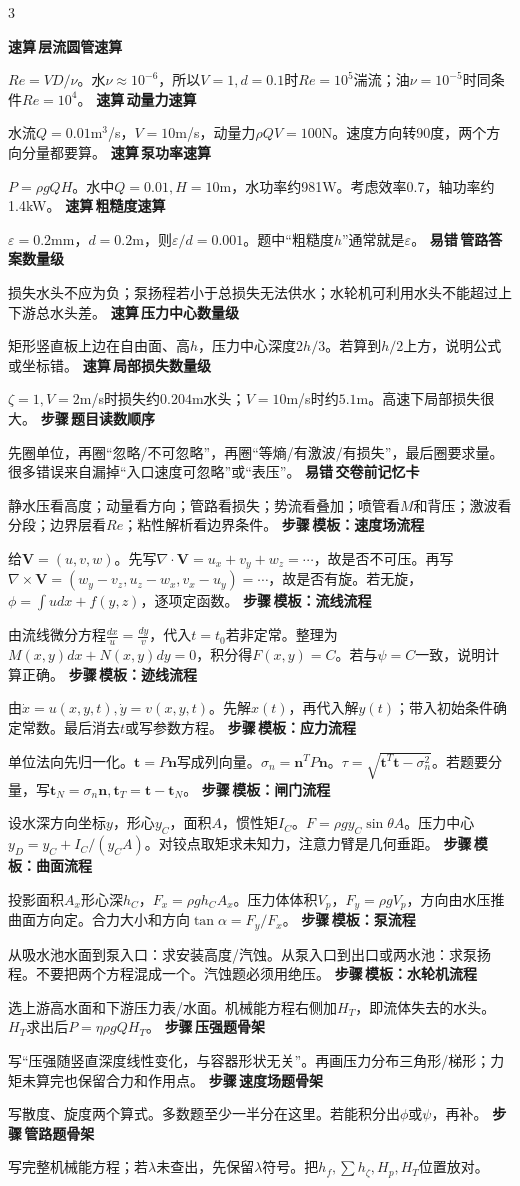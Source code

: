 \documentclass[a4paper]{article}
\newcommand{\labtag}[3]{{\bfseries\color{#1}\colorbox{#1}{\color{white}\fontsize{2.35}{2.48}\selectfont #2}\,#3}\par}
\newcommand{\step}[1]{\labtag{S}{步骤}{#1}}
\newcommand{\err}[1]{\labtag{R}{易错}{#1}}
\newcommand{\stepq}[1]{\step{#1}}
\newcommand{\errq}[1]{\err{#1}}
\newcommand{\quickq}[1]{\labtag{F}{速算}{#1}}
\newenvironment{vfourWrap}{\par\begingroup\fontsize{2.68}{2.84}\selectfont\setlength{\fboxsep}{0.45pt}}{\par\endgroup}
\begin{document}
\begin{multicols}{3}
\begin{vfourWrap}
\quickq{层流圆管速算}
$Re=VD/\nu$。水$\nu\approx10^{-6}$，所以$V=1,d=0.1$时$Re=10^5$湍流；油$\nu=10^{-5}$时同条件$Re=10^4$。
\quickq{动量力速算}
水流$Q=0.01$m$^3$/s，$V=10$m/s，动量力$\rho QV=100$N。速度方向转90度，两个方向分量都要算。
\quickq{泵功率速算}
$P=\rho gQH$。水中$Q=0.01,H=10$m，水功率约981W。考虑效率0.7，轴功率约1.4kW。
\quickq{粗糙度速算}
$\varepsilon=0.2$mm，$d=0.2$m，则$\varepsilon/d=0.001$。题中“粗糙度$h$”通常就是$\varepsilon$。
\errq{管路答案数量级}
损失水头不应为负；泵扬程若小于总损失无法供水；水轮机可利用水头不能超过上下游总水头差。
\quickq{压力中心数量级}
矩形竖直板上边在自由面、高$h$，压力中心深度$2h/3$。若算到$h/2$上方，说明公式或坐标错。
\quickq{局部损失数量级}
$\zeta=1,V=2$m/s时损失约$0.204$m水头；$V=10$m/s时约$5.1$m。高速下局部损失很大。
\stepq{题目读数顺序}
先圈单位，再圈“忽略/不可忽略”，再圈“等熵/有激波/有损失”，最后圈要求量。很多错误来自漏掉“入口速度可忽略”或“表压”。
\errq{交卷前记忆卡}
静水压看高度；动量看方向；管路看损失；势流看叠加；喷管看$M$和背压；激波看分段；边界层看$Re$；粘性解析看边界条件。
\stepq{模板：速度场流程}
给$\bm V=(u,v,w)$。先写$\nabla\cdot\bm V=u_x+v_y+w_z=\cdots$，故是否不可压。再写$\nabla\times\bm V=(w_y-v_z,u_z-w_x,v_x-u_y)=\cdots$，故是否有旋。若无旋，$\phi=\int u dx+f(y,z)$，逐项定函数。
\stepq{模板：流线流程}
由流线微分方程$\frac{dx}{u}=\frac{dy}{v}$，代入$t=t_0$若非定常。整理为$M(x,y)dx+N(x,y)dy=0$，积分得$F(x,y)=C$。若与$\psi=C$一致，说明计算正确。
\stepq{模板：迹线流程}
由$\dot x=u(x,y,t),\dot y=v(x,y,t)$。先解$x(t)$，再代入解$y(t)$；带入初始条件确定常数。最后消去$t$或写参数方程。
\stepq{模板：应力流程}
单位法向先归一化。$\bm t=P\bm n$写成列向量。$\sigma_n=\bm n^T P\bm n$。$\tau=\sqrt{\bm t^T\bm t-\sigma_n^2}$。若题要分量，写$\bm t_N=\sigma_n\bm n,\bm t_T=\bm t-\bm t_N$。
\stepq{模板：闸门流程}
设水深方向坐标$y$，形心$y_C$，面积$A$，惯性矩$I_C$。$F=\rho g y_C\sin\theta A$。压力中心$y_D=y_C+I_C/(y_CA)$。对铰点取矩求未知力，注意力臂是几何垂距。
\stepq{模板：曲面流程}
投影面积$A_x$形心深$h_C$，$F_x=\rho gh_CA_x$。压力体体积$V_p$，$F_y=\rho gV_p$，方向由水压推曲面方向定。合力大小和方向$\tan\alpha=F_y/F_x$。
\stepq{模板：泵流程}
从吸水池水面到泵入口：求安装高度/汽蚀。从泵入口到出口或两水池：求泵扬程。不要把两个方程混成一个。汽蚀题必须用绝压。
\stepq{模板：水轮机流程}
选上游高水面和下游压力表/水面。机械能方程右侧加$H_T$，即流体失去的水头。$H_T$求出后$P=\eta\rho gQH_T$。
\stepq{压强题骨架}
写“压强随竖直深度线性变化，与容器形状无关”。再画压力分布三角形/梯形；力矩未算完也保留合力和作用点。
\stepq{速度场题骨架}
写散度、旋度两个算式。多数题至少一半分在这里。若能积分出$\phi$或$\psi$，再补。
\stepq{管路题骨架}
写完整机械能方程；若$\lambda$未查出，先保留$\lambda$符号。把$h_f,\sum h_\zeta,H_p,H_T$位置放对。

\end{vfourWrap}
\end{multicols}
\end{document}
